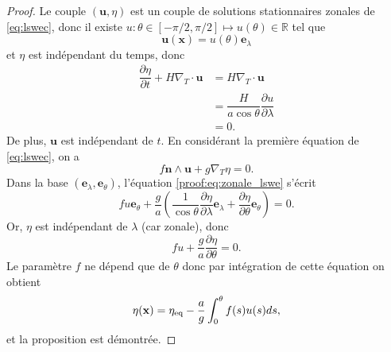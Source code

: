 \begin{proof}
Le couple $(\mathbf{u}, \eta)$ est un couple de solutions stationnaires zonales de \eqref{eq:lswec}, donc il existe $u : \theta \in [- \pi/2, \pi/2] \mapsto u(\theta) \in \mathbb{R}$ tel que
\begin{equation}
\mathbf{u}(\mathbf{x}) = u(\theta) \mathbf{e}_{\lambda}
\end{equation}
et $\eta$ est indépendant du temps, donc
\begin{align*}
\dfrac{\partial \eta}{\partial t} + H \nabla_T \cdot \mathbf{u} & = H \nabla_T \cdot \mathbf{u} \\
	& = \dfrac{H}{a \cos \theta} \dfrac{\partial u}{\partial \lambda} \\
	& = 0.
\end{align*}
De plus, $\mathbf{u}$ est indépendant de $t$. En considérant la première équation de \eqref{eq:lswec}, on a
\begin{equation}
f \mathbf{n} \wedge \mathbf{u} + g \nabla_T \eta = 0.
\label{proof:eq:zonale_lswe}
\end{equation}
Dans la base $(\mathbf{e}_{\lambda}, \mathbf{e}_{\theta})$, l'équation \eqref{proof:eq:zonale_lswe} s'écrit
\begin{equation}
f u \mathbf{e}_{\theta} + \dfrac{g}{a} \left( \dfrac{1}{\cos \theta} \dfrac{\partial \eta}{\partial \lambda} \mathbf{e}_{\lambda} + \dfrac{\partial \eta}{\partial \theta} \mathbf{e}_{\theta} \right) = 0.
\end{equation}
Or, $\eta$ est indépendant de $\lambda$ (car zonale), donc
\begin{equation}
f u + \dfrac{g}{a} \dfrac{\partial \eta}{\partial \theta} = 0.
\end{equation}
Le paramètre $f$ ne dépend que de $\theta$ donc par intégration de cette équation on obtient
\begin{equation}
\eta(\mathbf{x}) = \eta_{\text{eq}} - \dfrac{a}{g} \displaystyle\int_{0}^{\theta} f(s) u(s) ds,
\end{equation}
et la proposition est démontrée.
\end{proof}

